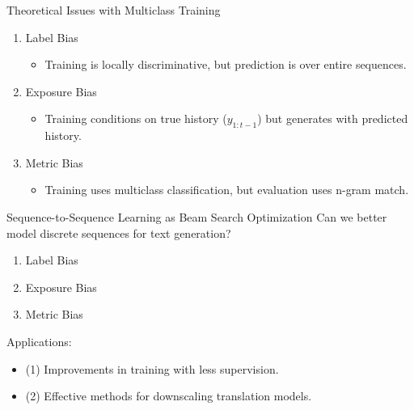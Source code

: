 

\begin{frame}{Theoretical Issues with Multiclass Training}
  \begin{enumerate}
  \item Label Bias  %
    \begin{itemize}
    \item Training is locally discriminative, but prediction is over entire sequences.
    \end{itemize}
    \air
    \pause

  \item Exposure Bias
    \begin{itemize}
    \item Training conditions on true history ($y_{1:t-1}$) but generates with predicted history.
    \end{itemize}
    \air
    \pause

  \item Metric Bias
    \begin{itemize}
    \item Training uses multiclass classification, but evaluation uses n-gram match.
    \end{itemize}
    \air

  \end{enumerate}
\end{frame}

\begin{frame}{Sequence-to-Sequence Learning as Beam Search Optimization}
  Can we better model discrete sequences for text generation?

  \air
  \begin{enumerate}
  \item Label Bias
    \air
  \item Exposure Bias
    \air
  \item Metric Bias
    \air

  \end{enumerate}

  Applications:

  \begin{itemize}
  \item (1) Improvements in training with less supervision.
    \air
  \item (2) Effective methods for downscaling translation models.
    \air
  \end{itemize}
\end{frame}


